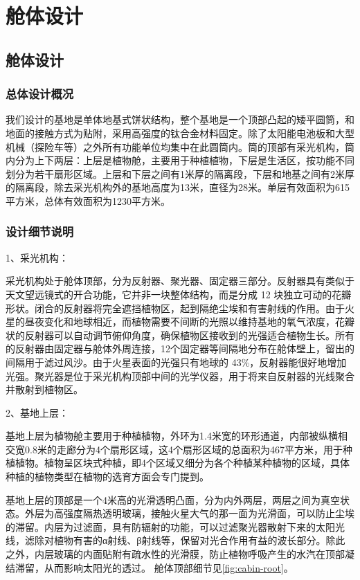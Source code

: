 \chapter{舱体设计}
\label{chp:cabin:begin}
\section{舱体设计}

\subsection{总体设计概况}

我们设计的基地是单体地基式饼状结构，整个基地是一个顶部凸起的矮平圆筒，和地面的接触方式为贴附，采用高强度的钛合金材料固定。除了太阳能电池板和大型机械（探险车等）之外所有功能单位均集中在此圆筒内。筒的顶部有采光机构，筒内分为上下两层：上层是植物舱，主要用于种植植物，下层是生活区，按功能不同划分为若干扇形区域。上层和下层之间有1米厚的隔离段，下层和地基之间有2米厚的隔离段，除去采光机构外的基地高度为13米，直径为28米。单层有效面积为615平方米，总体有效面积为1230平方米。

\subsection{设计细节说明}

1、采光机构：

采光机构处于舱体顶部，分为反射器、聚光器、固定器三部分。反射器具有类似于天文望远镜式的开合功能，它并非一块整体结构，而是分成 12 块独立可动的花瓣形状。闭合的反射器将完全遮挡植物区，起到隔绝尘埃和有害射线的作用。由于火星的昼夜变化和地球相近，而植物需要不间断的光照以维持基地的氧气浓度，花瓣状的反射器可以自动调节俯仰角度，确保植物区接收到的光强适合植物生长。所有的反射器由固定器与舱体外周连接，12个固定器等间隔地分布在舱体壁上，留出的间隔用于滤过风沙。由于火星表面的光强只有地球的 43\%，反射器能很好地增加光强。聚光器是位于采光机构顶部中间的光学仪器，用于将来自反射器的光线聚合并散射到植物区。

2、基地上层：

基地上层为植物舱主要用于种植植物，外环为1.4米宽的环形通道，内部被纵横相交宽0.8米的走廊分为4个扇形区域，这4个扇形区域的总面积为467平方米，用于种植植物。植物呈区块式种植，即4个区域又细分为各个种植某种植物的区域，具体种植的植物类型在植物的选育方面会专门提到。

基地上层的顶部是一个4米高的光滑透明凸面，分为内外两层，两层之间为真空状态。外层为高强度隔热透明玻璃，接触火星大气的那一面为光滑面，可以防止尘埃的滞留。内层为过滤面，具有防辐射的功能，可以过滤聚光器散射下来的太阳光线，滤除对植物有害的α射线、β射线等，保留对光合作用有益的波长部分。除此之外，内层玻璃的内面贴附有疏水性的光滑膜，防止植物呼吸产生的水汽在顶部凝结滞留，从而影响太阳光的透过。
舱体顶部细节见\cref{fig:cabin-root}。

